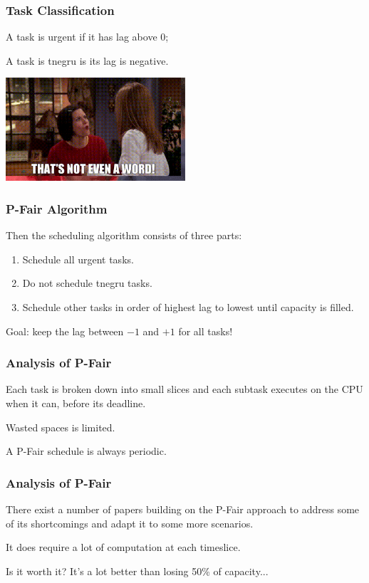 \begin{frame}
\frametitle{Task Classification}

A task is \alert{urgent} if it has lag above 0;

A task is \alert{tnegru} is its lag is negative.

\begin{center}
	\includegraphics[width=0.5\textwidth]{images/notaword.jpg}
\end{center}

\end{frame}

\begin{frame}
\frametitle{P-Fair Algorithm}

Then the scheduling algorithm consists of three parts:
\begin{enumerate}
	\item Schedule all urgent tasks.
	\item Do not schedule tnegru tasks.
	\item Schedule other tasks in order of highest lag to lowest until capacity is filled.
\end{enumerate}

Goal: keep the lag between $-1$ and $+1$ for all tasks!

\end{frame}

\begin{frame}
\frametitle{Analysis of P-Fair}

Each task is broken down into small slices and each subtask executes on the CPU when it can, before its deadline.

Wasted spaces is limited.

A P-Fair schedule is always periodic.

\end{frame}

\begin{frame}
\frametitle{Analysis of P-Fair}

There exist a number of papers building on the P-Fair approach to address some of its shortcomings and adapt it to some more scenarios.

It does require a lot of computation at each timeslice.

Is it worth it? It's a lot better than losing 50\% of capacity...

\end{frame}



